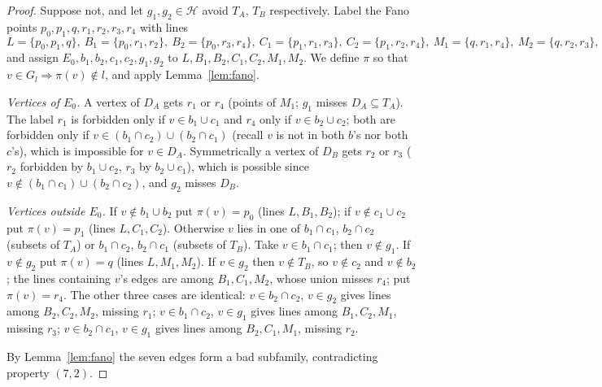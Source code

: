 \documentclass[11pt]{amsart}
\theoremstyle{definition}
\theoremstyle{remark}
\newcommand{\cH}{\mathcal H}
\begin{document}
\begin{proof}
Suppose not, and let $g_1,g_2\in\cH$ avoid $T_A$, $T_B$ respectively. Label the Fano points $p_0,p_1,q,r_1,r_2,r_3,r_4$ with lines
\[
L=\{p_0,p_1,q\},\ B_1=\{p_0,r_1,r_2\},\ B_2=\{p_0,r_3,r_4\},\ C_1=\{p_1,r_1,r_3\},\ C_2=\{p_1,r_2,r_4\},\ M_1=\{q,r_1,r_4\},\ M_2=\{q,r_2,r_3\},
\]
and assign $E_0,b_1,b_2,c_1,c_2,g_1,g_2$ to $L,B_1,B_2,C_1,C_2,M_1,M_2$. We define $\pi$ so that $v\in G_l\Rightarrow\pi(v)\notin l$, and apply Lemma~\ref{lem:fano}.

\emph{Vertices of $E_0$.} A vertex of $D_A$ gets $r_1$ or $r_4$ (points of $M_1$; $g_1$ misses $D_A\subseteq T_A$). The label $r_1$ is forbidden only if $v\in b_1\cup c_1$ and $r_4$ only if $v\in b_2\cup c_2$; both are forbidden only if $v\in(b_1\cap c_2)\cup(b_2\cap c_1)$ (recall $v$ is not in both $b$'s nor both $c$'s), which is impossible for $v\in D_A$. Symmetrically a vertex of $D_B$ gets $r_2$ or $r_3$ ($r_2$ forbidden by $b_1\cup c_2$, $r_3$ by $b_2\cup c_1$), which is possible since $v\notin(b_1\cap c_1)\cup(b_2\cap c_2)$, and $g_2$ misses $D_B$.

\emph{Vertices outside $E_0$.} If $v\notin b_1\cup b_2$ put $\pi(v)=p_0$ (lines $L,B_1,B_2$); if $v\notin c_1\cup c_2$ put $\pi(v)=p_1$ (lines $L,C_1,C_2$). Otherwise $v$ lies in one of $b_1\cap c_1$, $b_2\cap c_2$ (subsets of $T_A$) or $b_1\cap c_2$, $b_2\cap c_1$ (subsets of $T_B$). Take $v\in b_1\cap c_1$; then $v\notin g_1$. If $v\notin g_2$ put $\pi(v)=q$ (lines $L,M_1,M_2$). If $v\in g_2$ then $v\notin T_B$, so $v\notin c_2$ and $v\notin b_2$; the lines containing $v$'s edges are among $B_1,C_1,M_2$, whose union misses $r_4$; put $\pi(v)=r_4$. The other three cases are identical: $v\in b_2\cap c_2$, $v\in g_2$ gives lines among $B_2,C_2,M_2$, missing $r_1$; $v\in b_1\cap c_2$, $v\in g_1$ gives lines among $B_1,C_2,M_1$, missing $r_3$; $v\in b_2\cap c_1$, $v\in g_1$ gives lines among $B_2,C_1,M_1$, missing $r_2$.

By Lemma~\ref{lem:fano} the seven edges form a bad subfamily, contradicting property $(7,2)$.
\end{proof}
\end{document}
